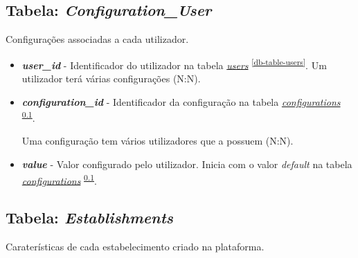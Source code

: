 \documentclass[11pt, a4paper, sans]{article}
\begin{document}
	\subsection{Tabela: \textit{Configuration\_User}} \label{db-table-configuration-user}

	Configurações associadas a cada utilizador.

	\begin{itemize}
		\item \textbf{\textit{user\_id}} - Identificador do utilizador na tabela \underline{\textit{users}} \textsuperscript{\ref{db-table-users}}. Um utilizador terá várias configurações (N:N).
		\item \textbf{\textit{configuration\_id}} - Identificador da configuração na tabela \underline{\textit{configurations}} \textsuperscript{\ref{db-table-configuration-user}}. 

			Uma configuração tem vários utilizadores que a possuem (N:N).
		\item \textbf{\textit{value}} - Valor configurado pelo utilizador. Inicia com o valor \textit{default} na tabela \underline{\textit{configurations}} \textsuperscript{\ref{db-table-configuration-user}}.
	\end{itemize}

	\subsection{Tabela: \textit{Establishments}} \label{db-table-establishments}

	Caraterísticas de cada estabelecimento criado na plataforma.
\end{document}
